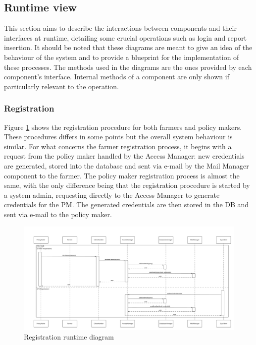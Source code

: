 \documentclass[10pt]{article} %
\begin{document}
\subsection{Runtime view}
This section aims to describe the interactions between components and their interfaces at runtime, detailing some crucial operations such as login and report insertion.
It should be noted that these diagrams are meant to give an idea of the behaviour of the system and to provide a blueprint for the implementation of these processes. 
The methods used in the diagrams are the ones provided by each component's interface. Internal methods of a component are only shown if particularly relevant to the operation.
\subsubsection{Registration}
Figure \ref{fig:r_registration} shows the registration procedure for both farmers and policy makers. These procedures differs in some points but the overall system behaviour
is similar. For what concerns the farmer registration process, it begins with a request from the policy maker handled by the Access Manager: new credentials are generated, stored into 
the database and sent via e-mail by the Mail Manager component to the farmer. The policy maker registration process is almost the same, with the only difference being that the 
registration procedure is started by a system admin, requesting directly to the Access Manager to generate credentials for the PM. The generated credentials are then stored in the DB and
sent via e-mail to the policy maker.
\begin{figure}[h!]
    \centering
    \centerline{\includegraphics[scale=0.375]{images/rv/registration.png}}
    \caption{Registration runtime diagram}
    \label{fig:r_registration}
\end{figure}
\end{document}
